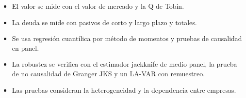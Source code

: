 \documentclass{article}
\newcommand{\cardtitlesize}{\fontsize{37.8}{45.4}\selectfont}
\newcommand{\cardtitle}[2][navy]{{\color{#1}\cardtitlesize\bfseries\textls[110]{\MakeUppercase{#2}}}\par\vspace{7mm}}
\begin{document}
\vfill
\hspace*{34mm}\begin{minipage}{773mm}
\begin{tcolorbox}[card]\cardtitle{Metodología}
\begin{minipage}[t]{0.48\linewidth}
\begin{itemize}
\item El valor se mide con el valor de mercado y la Q de Tobin.
\item La deuda se mide con pasivos de corto y largo plazo y totales.
\item Se usa regresión cuantílica por método de momentos y pruebas de causalidad en panel.
\end{itemize}
\end{minipage}\hfill
\begin{minipage}[t]{0.48\linewidth}
\begin{itemize}
\item La robustez se verifica con el estimador jackknife de medio panel, la prueba de no causalidad de Granger JKS y un LA-VAR con remuestreo.
\item Las pruebas consideran la heterogeneidad y la dependencia entre empresas.
\end{itemize}
\end{minipage}
\end{tcolorbox}
\end{minipage}
\end{document}
